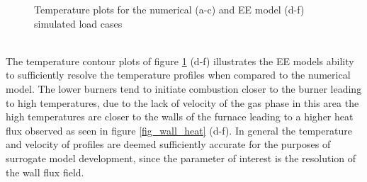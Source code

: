 \documentclass{webofc}
\begin{document}
\begin{figure}[h!]
\setlength{\belowcaptionskip}{0pt}
\caption{Temperature plots for the numerical (a-c) and EE model (d-f) simulated load cases}
\label{fig_temp}
\end{figure}\\
The temperature contour plots of figure \ref{fig_temp} (d-f) illustrates the EE models ability to sufficiently resolve the temperature profiles when compared to the numerical model. The lower burners tend to initiate combustion closer to the burner leading to high temperatures, due to the lack of velocity of the gas phase in this area the high temperatures  are closer to the walls of the furnace leading to a higher heat flux observed as seen in figure \ref{fig_wall_heat} (d-f). In general the temperature and velocity of profiles are deemed sufficiently accurate for the purposes of surrogate model development, since the parameter of interest is the resolution of the wall flux field.
\end{document}
